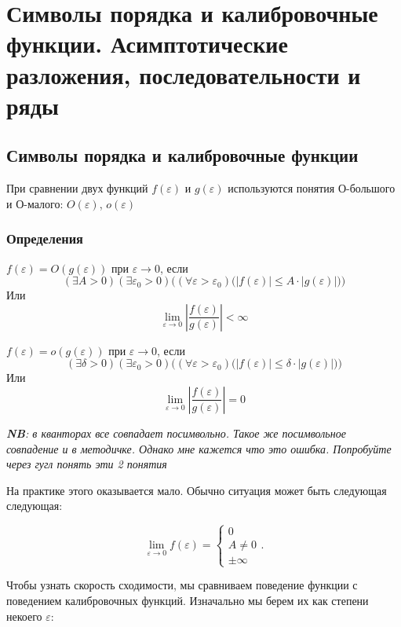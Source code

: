 	\newpage
	
	\section{Символы порядка и калибровочные функции. Асимптотические разложения, последовательности и ряды}
	
	\subsection{Символы порядка и калибровочные функции}
	
	При сравнении двух функций $f(\varepsilon)$ и $g(\varepsilon)$ используются понятия О-большого и О-малого: $O(\varepsilon)$, $o(\varepsilon)$
	
	\subsubsection{Определения}
	
	$f(\varepsilon) = O(g(\varepsilon))$ при $\varepsilon \to 0$, если $$(\exists A > 0)(\exists \varepsilon_0 > 0)\bigl((\forall \varepsilon > \varepsilon_0)\bigl(|f(\varepsilon)| \leq A \cdot |g(\varepsilon)|\bigr)\bigr)$$ Или $$\lim_{\varepsilon \to 0} \left| \frac{f(\varepsilon)}{g(\varepsilon)} \right| < \infty$$
	
	$f(\varepsilon) = o(g(\varepsilon))$ при $\varepsilon \to 0$, если $$(\exists \delta > 0)(\exists \varepsilon_0 > 0)\bigl((\forall \varepsilon > \varepsilon_0)\bigl(|f(\varepsilon)| \leq \delta \cdot |g(\varepsilon)|\bigr)\bigr)$$ Или $$\lim_{\varepsilon \to 0} \left| \frac{f(\varepsilon)}{g(\varepsilon)} \right| = 0$$
	
	\textit{\textbf{NB}: в кванторах все совпадает посимвольно. Такое же посимвольное совпадение и в методичке. Однако мне кажется что это ошибка. Попробуйте через гугл понять эти 2 понятия}
	
	На практике этого оказывается мало. Обычно ситуация может быть следующая следующая:
	
	\begin{equation}
		\lim_{\varepsilon \to 0} f(\varepsilon) =
		\begin{cases}
			0 \\
			A \neq 0 \\
			\pm \infty
		\end{cases}.
	\end{equation}
	
	Чтобы узнать скорость сходимости, мы сравниваем поведение функции с поведением калибровочных функций. Изначально мы берем их как степени некоего $\varepsilon$:
	
